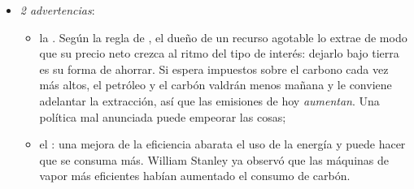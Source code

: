 \documentclass[11pt]{article}
\begin{document}
\begin{itemize}
\item \emph{2 advertencias}:
  \begin{itemize}
  \item la \nocite{Sinn2008Public}. Según la regla de \textcite{Hotelling1931Economics}, el dueño de un recurso agotable lo extrae de modo que su precio neto crezca al ritmo del tipo de interés: dejarlo bajo tierra es su forma de ahorrar. Si espera impuestos sobre el carbono cada vez más altos, el petróleo y el carbón valdrán menos mañana y le conviene adelantar la extracción, así que las emisiones de hoy \emph{aumentan}. Una política mal anunciada puede empeorar las cosas;
  \item el : una mejora de la eficiencia abarata el uso de la energía y puede hacer que se consuma más. William Stanley \textcite{Jevons1865Coal} ya observó que las máquinas de vapor más eficientes habían aumentado el consumo de carbón.
  \end{itemize}
\end{itemize}
\end{document}
